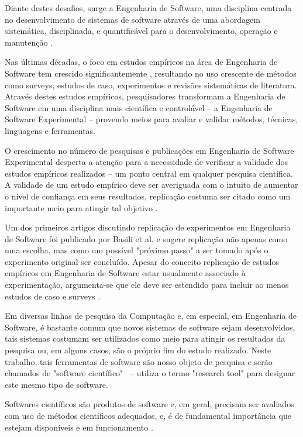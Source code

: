 \documentclass[12pt]{article}
\begin{document}
Diante destes desafios, surge a Engenharia de Software, uma disciplina
centrada no desenvolvimento de sistemas de software \cite{Wohlin2012} através
de uma abordagem sistemática, disciplinada, e quantificável para o
desenvolvimento, operação e manutenção \cite{SWEBOK2014}.

Nas últimas décadas, o foco em estudos empíricos na área de Engenharia de
Software tem crescido significantemente \cite{Stol2015}, resultando no uso
crescente de métodos como surveys, estudos de caso, experimentos e revisões
sistemáticas de literatura. Através destes estudos empíricos, pesquisadores
transformam a Engenharia de Software em uma disciplina mais científica e
controlável -- a  Engenharia de Software Experimental -- provendo meios para
avaliar e validar métodos, técnicas, linguagens e ferramentas.

O crescimento no número de pesquisas e publicações em Engenharia de Software
Experimental desperta a atenção para a necessidade de verificar a validade dos
estudos empíricos realizados -- um ponto central em qualquer pesquisa
científica. A validade de um estudo empírico deve ser averiguada com o intuito
de aumentar o nível de confiança em seus resultados, replicação costuma ser
citado como um importante meio para atingir tal objetivo \cite{Almqvist2006}.

Um dos primeiros artigos discutindo replicação de experimentos em Engenharia
de Software foi publicado por Basili et al. \cite{Mantyla2010} e sugere
replicação não apenas como uma escolha, mas como um possível "próximo passo" a
ser tomado após o experimento original ser concluído. Apesar do conceito
replicação de estudos empíricos em Engenharia de Software estar usualmente
associado à experimentação, argumenta-se que ele deve ser estendido para
incluir ao menos estudos de caso e surveys \cite{Basili1986}.

Em diversas linhas de pesquisa da Computação e, em especial, em Engenharia de
Software, é bastante comum que novos sistemas de software sejam desenvolvidos,
tais sistemas costumam ser utilizados como meio para atingir os resultados da
pesquisa ou, em alguns casos, são o próprio fim do estudo realizado. Neste
trabalho, tais ferramentas de software são nosso objeto de pesquisa e serão
chamados de "software científico" \ --  utiliza o
termo "research tool" para designar este mesmo tipo de software.

Softwares científicos são produtos de software e, em geral, precisam ser
avaliados com uso de métodos científicos adequados, e, é de fundamental
importância que estejam disponíveis e em funcionamento \cite{Kon2011}.
\end{document}
